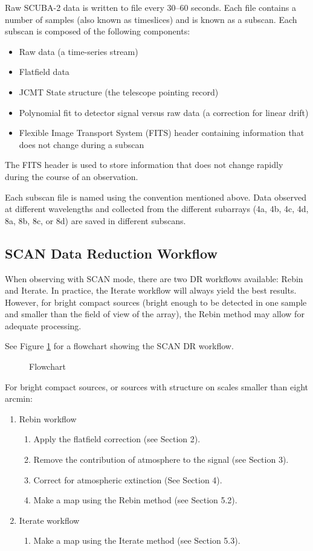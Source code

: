 \documentclass[twoside,11pt]{article}
\renewcommand{\_}{\texttt{\symbol{95}}}
\begin{document}
Raw SCUBA-2 data is written to file every 30--60 seconds. Each file
contains a number of samples (also known as timeslices) and is known
as a subscan. Each subscan is composed of the following components:
\begin{itemize}
\item Raw data (a time-series stream)
\item Flatfield data
\item JCMT State structure (the telescope pointing record)
\item Polynomial fit to detector signal versus raw data (a correction
  for linear drift)
\item Flexible Image Transport System (FITS) header containing
  information that does not change during a subscan
\end{itemize}
The FITS header is used to store information that does not change
rapidly during the course of an observation.

Each subscan file is named using the convention mentioned above. Data
observed at different wavelengths and collected from the different
subarrays (4a, 4b, 4c, 4d, 8a, 8b, 8c, or 8d) are saved in different
subscans.

\subsection{SCAN Data Reduction Workflow}

When observing with SCAN mode, there are two DR workflows available:
Rebin and Iterate. In practice, the Iterate workflow will always yield
the best results. However, for bright compact sources (bright enough
to be detected in one sample and smaller than the field of view of the
array), the Rebin method may allow for adequate processing.

See Figure \ref{flow} for a flowchart showing the SCAN DR workflow.

\begin{figure}
\caption{Flowchart\label{flow}}
\end{figure}

For bright compact sources, or sources with structure on scales
smaller than eight arcmin:
\begin{enumerate}
\item Rebin workflow
  \begin{enumerate}
  \item Apply the flatfield correction (see Section 2).
  \item Remove the contribution of atmosphere to the signal (see Section 3).
  \item Correct for atmospheric extinction (See Section 4).
  \item Make a map using the Rebin method (see Section 5.2).
  \end{enumerate}

\item Iterate workflow
  \begin{enumerate}
  \item Make a map using the Iterate method (see Section 5.3).
  \end{enumerate}
\end{enumerate}
\end{document}
